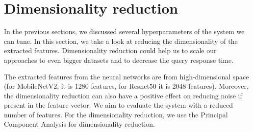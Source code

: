 


\section{Dimensionality reduction}

In the previous sections, we discussed several hyperparameters of the system we can tune. In this section, we take a look at reducing the dimensionality of the extracted features. Dimensionality reduction could help us to scale our approaches to even bigger datasets and to decrease the query response time.

The extracted features from the neural networks are from high-dimensional space (for MobileNetV2, it is 1280 features, for Resnet50 it is 2048 features). Moreover, the dimensionality reduction can also have a positive effect on reducing noise if present in the feature vector. We aim to evaluate the system with a reduced number of features. For the dimensionality reduction, we use the Principal Component Analysis  for dimensionality reduction.


